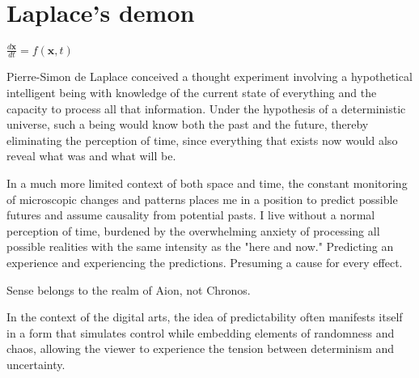 \chapter*{Laplace's demon}
\begin{center}
\vspace{2cm}
\begin{flushright}
\large
\textit{$\frac{d\mathbf{x}}{dt} = f(\mathbf{x}, t)$ }
\end{flushright}
\vspace{2cm}
\end{center}
\normalsize

Pierre-Simon de Laplace conceived a thought experiment involving a hypothetical intelligent being with knowledge of the current state of everything and the capacity to process all that information. Under the hypothesis of a deterministic universe, such a being would know both the past and the future, thereby eliminating the perception of time, since everything that exists now would also reveal what was and what will be.

In a much more limited context of both space and time, the constant monitoring of microscopic changes and patterns places me in a position to predict possible futures and assume causality from potential pasts. I live without a normal perception of time, burdened by the overwhelming anxiety of processing all possible realities with the same intensity as the "here and now." Predicting an experience and experiencing the predictions. Presuming a cause for every effect. 

Sense belongs to the realm of Aion, not Chronos. \citep{deleuze1969}

In the context of the digital arts, the idea of predictability often manifests itself in a form that simulates control while embedding elements of randomness and chaos, allowing the viewer to experience the tension between determinism and uncertainty.


